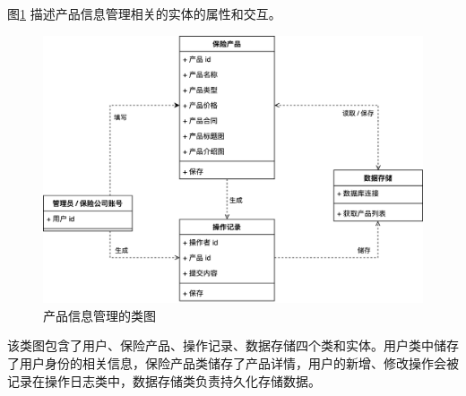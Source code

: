 \documentclass[a4paper]{ctexart}
\begin{document}
图\ref{fig:产品信息管理类图} 描述产品信息管理相关的实体的属性和交互。
\begin{figure}[H]
\centering
\includegraphics[scale=0.25]{image/4_3类图.png}
\caption{产品信息管理的类图}
\label{fig:产品信息管理类图}
\end{figure}
该类图包含了用户、保险产品、操作记录、数据存储四个类和实体。用户类中储存了用户身份的相关信息，保险产品类储存了产品详情，用户的新增、修改操作会被记录在操作日志类中，数据存储类负责持久化存储数据。\\
\end{document}
